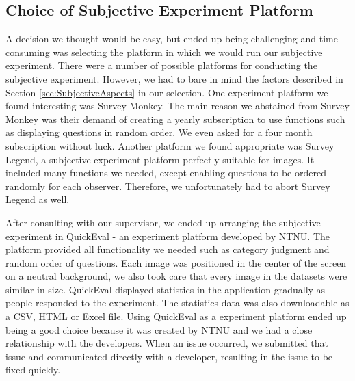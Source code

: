 \subsection{Choice of Subjective Experiment Platform}
\label{subsection:choicesoftware}
A decision we thought would be easy, but ended up being challenging and time consuming was selecting the platform in which we would run our subjective experiment. There were a number of possible platforms for conducting the subjective experiment. However, we had to bare in mind the factors described in Section \ref{sec:SubjectiveAspects} in our selection. One experiment platform we found interesting was Survey Monkey. The main reason we abstained from Survey Monkey was their demand of creating a yearly subscription to use functions such as displaying questions in random order. We even asked for a four month subscription without luck. Another platform we found appropriate was Survey Legend, a subjective experiment platform perfectly suitable for images. It included many functions we needed, except enabling questions to be ordered randomly for each observer. Therefore, we unfortunately had to abort Survey Legend as well. 

After consulting with our supervisor, we ended up arranging the subjective experiment in QuickEval \cite{QuickEval} - an experiment platform developed by NTNU. The platform provided all functionality we needed such as category judgment and random order of questions. Each image was positioned in the center of the screen on a neutral background, we also took care that every image in the datasets were similar in size. QuickEval displayed statistics in the application gradually as people responded to the experiment. The statistics data was also downloadable as a CSV, HTML or Excel file. Using QuickEval as a experiment platform ended up being a good choice because it was created by NTNU and we had a close relationship with the developers. When an issue occurred, we submitted that issue and communicated directly with a developer, resulting in the issue to be fixed quickly. 

